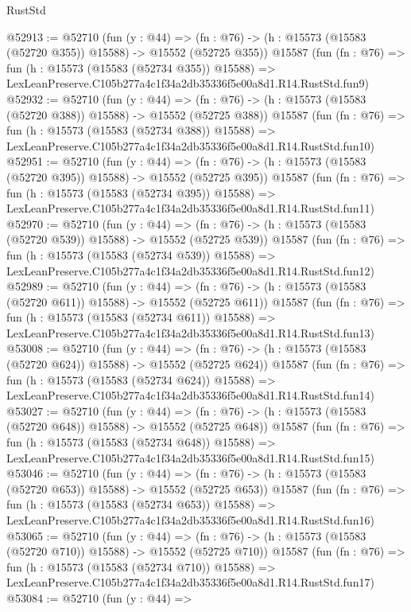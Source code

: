 \begin{lexlean}{RustStd}
\begin{coremodule}
@52913 := @52710
    (fun (y : @44) =>
    (fn : @76) -> (h : @15573 (@15583 (@52720 @355)) @15588) -> @15552 (@52725 @355))
    @15587
    (fun (fn : @76) =>
    fun (h : @15573 (@15583 (@52734 @355)) @15588) =>
    LexLeanPreserve.C105b277a4c1f34a2db35336f5e00a8d1.R14.RustStd.fun9)
@52932 := @52710
    (fun (y : @44) =>
    (fn : @76) -> (h : @15573 (@15583 (@52720 @388)) @15588) -> @15552 (@52725 @388))
    @15587
    (fun (fn : @76) =>
    fun (h : @15573 (@15583 (@52734 @388)) @15588) =>
    LexLeanPreserve.C105b277a4c1f34a2db35336f5e00a8d1.R14.RustStd.fun10)
@52951 := @52710
    (fun (y : @44) =>
    (fn : @76) -> (h : @15573 (@15583 (@52720 @395)) @15588) -> @15552 (@52725 @395))
    @15587
    (fun (fn : @76) =>
    fun (h : @15573 (@15583 (@52734 @395)) @15588) =>
    LexLeanPreserve.C105b277a4c1f34a2db35336f5e00a8d1.R14.RustStd.fun11)
@52970 := @52710
    (fun (y : @44) =>
    (fn : @76) -> (h : @15573 (@15583 (@52720 @539)) @15588) -> @15552 (@52725 @539))
    @15587
    (fun (fn : @76) =>
    fun (h : @15573 (@15583 (@52734 @539)) @15588) =>
    LexLeanPreserve.C105b277a4c1f34a2db35336f5e00a8d1.R14.RustStd.fun12)
@52989 := @52710
    (fun (y : @44) =>
    (fn : @76) -> (h : @15573 (@15583 (@52720 @611)) @15588) -> @15552 (@52725 @611))
    @15587
    (fun (fn : @76) =>
    fun (h : @15573 (@15583 (@52734 @611)) @15588) =>
    LexLeanPreserve.C105b277a4c1f34a2db35336f5e00a8d1.R14.RustStd.fun13)
@53008 := @52710
    (fun (y : @44) =>
    (fn : @76) -> (h : @15573 (@15583 (@52720 @624)) @15588) -> @15552 (@52725 @624))
    @15587
    (fun (fn : @76) =>
    fun (h : @15573 (@15583 (@52734 @624)) @15588) =>
    LexLeanPreserve.C105b277a4c1f34a2db35336f5e00a8d1.R14.RustStd.fun14)
@53027 := @52710
    (fun (y : @44) =>
    (fn : @76) -> (h : @15573 (@15583 (@52720 @648)) @15588) -> @15552 (@52725 @648))
    @15587
    (fun (fn : @76) =>
    fun (h : @15573 (@15583 (@52734 @648)) @15588) =>
    LexLeanPreserve.C105b277a4c1f34a2db35336f5e00a8d1.R14.RustStd.fun15)
@53046 := @52710
    (fun (y : @44) =>
    (fn : @76) -> (h : @15573 (@15583 (@52720 @653)) @15588) -> @15552 (@52725 @653))
    @15587
    (fun (fn : @76) =>
    fun (h : @15573 (@15583 (@52734 @653)) @15588) =>
    LexLeanPreserve.C105b277a4c1f34a2db35336f5e00a8d1.R14.RustStd.fun16)
@53065 := @52710
    (fun (y : @44) =>
    (fn : @76) -> (h : @15573 (@15583 (@52720 @710)) @15588) -> @15552 (@52725 @710))
    @15587
    (fun (fn : @76) =>
    fun (h : @15573 (@15583 (@52734 @710)) @15588) =>
    LexLeanPreserve.C105b277a4c1f34a2db35336f5e00a8d1.R14.RustStd.fun17)
@53084 := @52710
    (fun (y : @44) =>

\end{coremodule}
\end{lexlean}
